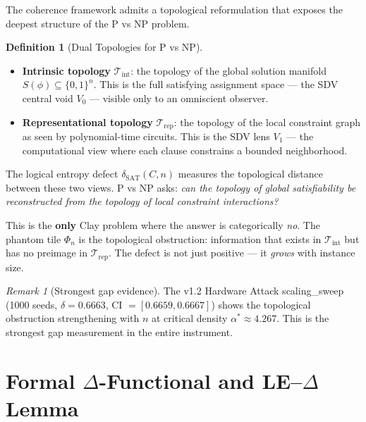 \documentclass[11pt]{article}
\theoremstyle{definition}
\newtheorem{definition}[theorem]{Definition}
\theoremstyle{remark}
\newtheorem{remark}[theorem]{Remark}
\begin{document}
The coherence framework admits a topological reformulation that
exposes the deepest structure of the P vs NP problem.

\begin{definition}[Dual Topologies for P vs NP]
\label{def:pnp-topo}
\mbox{}
\begin{itemize}
\item \textbf{Intrinsic topology} $\mathcal{T}_{\mathrm{int}}$:
the topology of the global solution manifold $S(\phi) \subseteq
\{0,1\}^n$.  This is the full satisfying assignment space --- the
SDV central void $V_0$ --- visible only to an omniscient observer.
\item \textbf{Representational topology} $\mathcal{T}_{\mathrm{rep}}$:
the topology of the local constraint graph as seen by polynomial-time
circuits.  This is the SDV lens $V_1$ --- the computational view
where each clause constrains a bounded neighborhood.
\end{itemize}
\end{definition}

\noindent
The logical entropy defect $\delta_{\mathrm{SAT}}(C, n)$ measures the
topological distance between these two views.  P vs NP asks:
\emph{can the topology of global satisfiability be reconstructed from
the topology of local constraint interactions?}

This is the \textbf{only} Clay problem where the answer is categorically
\emph{no}.  The phantom tile $\Phi_n$ is the topological obstruction:
information that exists in $\mathcal{T}_{\mathrm{int}}$ but has no
preimage in $\mathcal{T}_{\mathrm{rep}}$.  The defect is not just
positive --- it \emph{grows} with instance size.

\begin{remark}[Strongest gap evidence]
The v1.2 Hardware Attack scaling\_sweep (1000 seeds, $\delta = 0.6663$,
CI $= [0.6659, 0.6667]$) shows the topological obstruction strengthening
with $n$ at critical density $\alpha^* \approx 4.267$.  This is the
strongest gap measurement in the entire instrument.
\end{remark}

\section{Formal $\Delta$-Functional and LE--$\Delta$ Lemma}
\label{sec:delta-functional}
\end{document}
